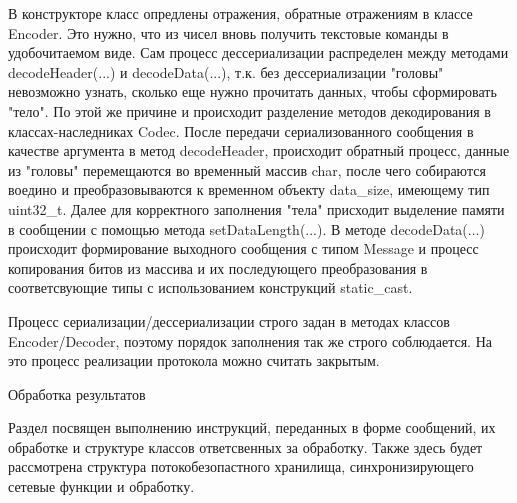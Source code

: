 \documentclass[a4paper, 14pt]{extreport}
\begin{document}
\par В конструкторе класс опредлены отражения, обратные отражениям в классе Encoder. Это нужно, что из чисел вновь получить текстовые 
команды в удобочитаемом виде. Сам процесс дессериализации распределен между методами decodeHeader(...) и decodeData(...), т.к. без 
дессериализации "головы" невозможно узнать, сколько еще нужно прочитать данных, чтобы сформировать "тело". По этой же причине 
и происходит разделение методов декодирования в классах-наследниках Codec. После передачи сериализованного сообщения в качестве аргумента 
в метод decodeHeader, происходит обратный процесс, данные из "головы" перемещаются во временный массив char, после чего собираются воедино 
и преобразовываются к временном объекту data\_size, имеющему тип uint32\_t. Далее для корректного заполнения "тела" присходит выделение 
памяти в сообщении с помощью метода setDataLength(...). В методе decodeData(...) происходит формирование выходного сообщения с типом 
Message и процесс копирования битов из массива и их последующего преобразования в соответсвующие типы с использованием конструкций 
static\_cast.
\par Процесс сериализации/дессериализации строго задан в методах классов Encoder/Decoder, поэтому порядок заполнения так же строго 
соблюдается. На это процесс реализации протокола можно считать закрытым.
\par{Обработка результатов}
\par Раздел посвящен выполнению инструкций, переданных в форме сообщений, их обработке и структуре классов ответсвенных за обработку.
Также здесь будет рассмотрена структура потокобезопастного хранилища, синхронизирующего сетевые функции и обработку.
\end{document}
